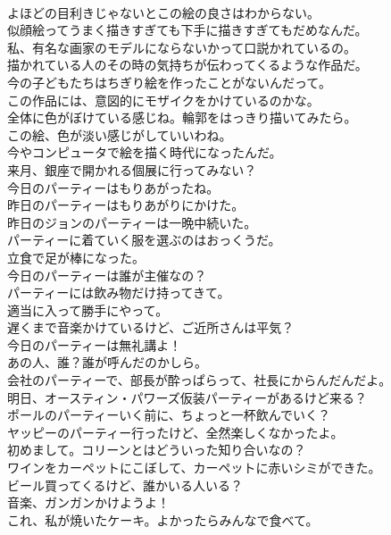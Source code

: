 \documentclass[8pt]{extreport}
\begin{document}
\begin{CJK}{UTF8}{min}
\\	よほどの目利きじゃないとこの絵の良さはわからない。	
\\	似顔絵ってうまく描きすぎても下手に描きすぎてもだめなんだ。	
\\	私、有名な画家のモデルにならないかって口説かれているの。	
\\	描かれている人のその時の気持ちが伝わってくるような作品だ。	
\\	今の子どもたちはちぎり絵を作ったことがないんだって。	
\\	この作品には、意図的にモザイクをかけているのかな。	
\\	全体に色がぼけている感じね。輪郭をはっきり描いてみたら。	
\\	この絵、色が淡い感じがしていいわね。	
\\	今やコンピュータで絵を描く時代になったんだ。	
\\	来月、銀座で開かれる個展に行ってみない？	
\\	今日のパーティーはもりあがったね。	
\\	昨日のパーティーはもりあがりにかけた。	
\\	昨日のジョンのパーティーは一晩中続いた。	
\\	パーティーに着ていく服を選ぶのはおっくうだ。	
\\	立食で足が棒になった。	
\\	今日のパーティーは誰が主催なの？	
\\	パーティーには飲み物だけ持ってきて。	
\\	適当に入って勝手にやって。	
\\	遅くまで音楽かけているけど、ご近所さんは平気？	
\\	今日のパーティーは無礼講よ！	
\\	あの人、誰？誰が呼んだのかしら。	
\\	会社のパーティーで、部長が酔っぱらって、社長にからんだんだよ。	
\\	明日、オースティン・パワーズ仮装パーティーがあるけど来る？	
\\	ポールのパーティーいく前に、ちょっと一杯飲んでいく？	
\\	ヤッピーのパーティー行ったけど、全然楽しくなかったよ。	
\\	初めまして。コリーンとはどういった知り合いなの？	
\\	ワインをカーペットにこぼして、カーペットに赤いシミができた。	
\\	ビール買ってくるけど、誰かいる人いる？	
\\	音楽、ガンガンかけようよ！	
\\	これ、私が焼いたケーキ。よかったらみんなで食べて。	

\end{CJK}
\end{document}
